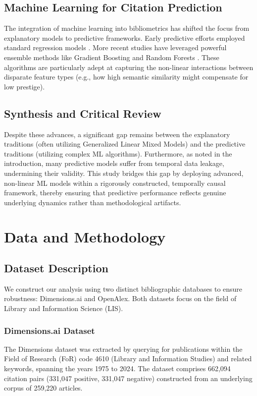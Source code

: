 \documentclass[12pt,a4paper]{article}
\begin{document}
\subsection{Machine Learning for Citation Prediction}
The integration of machine learning into bibliometrics has shifted the focus from explanatory models to predictive frameworks. Early predictive efforts employed standard regression models \cite{lokker2008prediction}. More recent studies have leveraged powerful ensemble methods like Gradient Boosting \cite{natekin2013gradient} and Random Forests \cite{breiman2001random}. These algorithms are particularly adept at capturing the non-linear interactions between disparate feature types (e.g., how high semantic similarity might compensate for low prestige).

\subsection{Synthesis and Critical Review}
Despite these advances, a significant gap remains between the explanatory traditions (often utilizing Generalized Linear Mixed Models) and the predictive traditions (utilizing complex ML algorithms). Furthermore, as noted in the introduction, many predictive models suffer from temporal data leakage, undermining their validity. This study bridges this gap by deploying advanced, non-linear ML models within a rigorously constructed, temporally causal framework, thereby ensuring that predictive performance reflects genuine underlying dynamics rather than methodological artifacts.

\section{Data and Methodology}

\subsection{Dataset Description}
We construct our analysis using two distinct bibliographic databases to ensure robustness: Dimensions.ai and OpenAlex. Both datasets focus on the field of Library and Information Science (LIS).

\subsubsection{Dimensions.ai Dataset}
The Dimensions dataset was extracted by querying for publications within the Field of Research (FoR) code 4610 (Library and Information Studies) and related keywords, spanning the years 1975 to 2024. The dataset comprises 662,094 citation pairs (331,047 positive, 331,047 negative) constructed from an underlying corpus of 259,220 articles.
\end{document}
